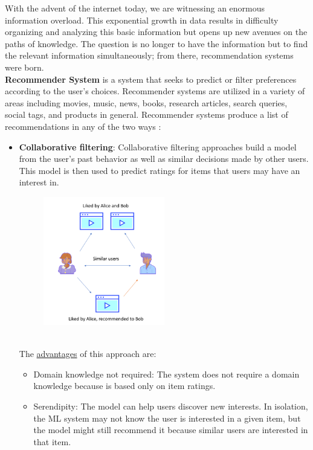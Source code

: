 \documentclass{article}
\begin{document}
With the advent of the internet today, we are witnessing an enormous information overload. This exponential growth in data results in difficulty organizing and analyzing this basic information but opens up new avenues on the paths of knowledge. The question is no longer to have the information but to find the relevant information simultaneously; from there, recommendation systems were born.\\ 
\textbf{Recommender System} is a system that seeks to predict or filter preferences according to the user’s choices. Recommender systems are utilized in a variety of areas including movies, music, news, books, research articles, search queries, social tags, and products in general. 
Recommender systems produce a list of recommendations in any of the two ways :
\begin{itemize}
      \item \textbf{Collaborative filtering}: Collaborative filtering approaches build a model from the user’s past behavior as well as similar decisions made by other users. This model is then used to predict ratings for items that users may have an interest in.\\
      \begin{figure}[h]
            \begin{center}
                  \includegraphics[width=0.5\textwidth]{images/Collaborative filtering.png}
            \end{center}
      \end{figure}\\
      The \underline{advantages} of this approach are:
      \begin{itemize}
            \item Domain knowledge not required: The system does not require a domain knowledge because is based only on item ratings.
            \item Serendipity: The model can help users discover new interests. In isolation, the ML system may not know the user is interested in a given item, but the model might still recommend it because similar users are interested in that item. 

\end{itemize}
\end{itemize}
\end{document}
